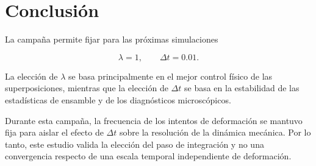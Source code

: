 \documentclass[11pt,a4paper]{article}
\begin{document}
\section{Conclusión}

La campaña permite fijar para las próximas simulaciones

\begin{equation}
\boxed{
\lambda=1,
\qquad
\Delta t=0.01
}.
\end{equation}

La elección de \(\lambda\) se basa principalmente en el mejor control físico
de las superposiciones, mientras que la elección de \(\Delta t\) se basa en la
estabilidad de las estadísticas de ensamble y de los diagnósticos
microscópicos.

Durante esta campaña, la frecuencia de los intentos de deformación se mantuvo
fija para aislar el efecto de \(\Delta t\) sobre la resolución de la dinámica
mecánica. Por lo tanto, este estudio valida la elección del paso de integración
y no una convergencia respecto de una escala temporal independiente de
deformación.
\end{document}
